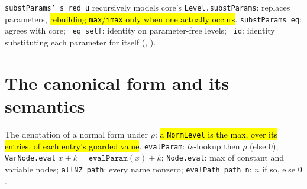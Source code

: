 \begin{definition}
\label{def:lvl-substparams}
\leanok
{}

 \texttt{substParams' s red u} recursively models core's \texttt{Level.substParams}:
replaces parameters, \hl{rebuilding \texttt{max}/\texttt{imax} only when one actually occurs}.
\texttt{substParams\_eq}: agrees with core; \texttt{\_eq\_self}: identity on parameter-free
levels; \texttt{\_id}: identity substituting each parameter for itself
(, ).
\end{definition}

\section{The canonical form and its semantics}

\begin{definition}
\label{def:lvl-normlevel-eval}
\leanok
{}

 The denotation of a normal form under $\rho$: \hl{a \texttt{NormLevel} is the max, over
its entries, of each entry's guarded value}. \texttt{evalParam}: $ls$-lookup then $\rho$ (else $0$);
\texttt{VarNode.eval} $x+k = \texttt{evalParam}(x)+k$; \texttt{Node.eval}: max of constant and variable
nodes; \texttt{allNZ path}: every name nonzero; \texttt{evalPath path n}: $n$ if so, else $0$.
\end{definition}

